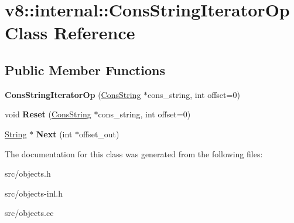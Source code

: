\hypertarget{classv8_1_1internal_1_1_cons_string_iterator_op}{}\section{v8\+:\+:internal\+:\+:Cons\+String\+Iterator\+Op Class Reference}
\label{classv8_1_1internal_1_1_cons_string_iterator_op}
\subsection*{Public Member Functions}
\begin{DoxyCompactItemize}
\item 
\hypertarget{classv8_1_1internal_1_1_cons_string_iterator_op_a8a5843984459c0413c09700361da2d8a}{}{\bfseries Cons\+String\+Iterator\+Op} (\hyperlink{classv8_1_1internal_1_1_cons_string}{Cons\+String} $\ast$cons\+\_\+string, int offset=0)\label{classv8_1_1internal_1_1_cons_string_iterator_op_a8a5843984459c0413c09700361da2d8a}

\item 
\hypertarget{classv8_1_1internal_1_1_cons_string_iterator_op_a3f62387c81ea8e8140fbe9350ddcf6ec}{}void {\bfseries Reset} (\hyperlink{classv8_1_1internal_1_1_cons_string}{Cons\+String} $\ast$cons\+\_\+string, int offset=0)\label{classv8_1_1internal_1_1_cons_string_iterator_op_a3f62387c81ea8e8140fbe9350ddcf6ec}

\item 
\hypertarget{classv8_1_1internal_1_1_cons_string_iterator_op_a82f916ea4e7cc29bf4bf47408367fca9}{}\hyperlink{classv8_1_1internal_1_1_string}{String} $\ast$ {\bfseries Next} (int $\ast$offset\+\_\+out)\label{classv8_1_1internal_1_1_cons_string_iterator_op_a82f916ea4e7cc29bf4bf47408367fca9}

\end{DoxyCompactItemize}


The documentation for this class was generated from the following files\+:\begin{DoxyCompactItemize}
\item 
src/objects.\+h\item 
src/objects-\/inl.\+h\item 
src/objects.\+cc\end{DoxyCompactItemize}
